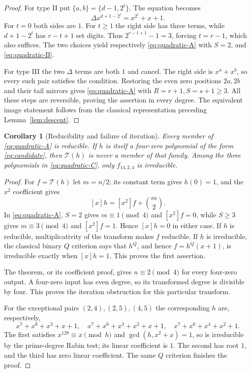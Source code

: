 \documentclass[11pt]{article}
\newtheorem{corollary}[proposition]{Corollary}
\theoremstyle{definition}
\theoremstyle{remark}
\begin{document}
\begin{proof}
For type II put $\{a,b\}=\{d-1,2^t\}$. The equation becomes
\[
 \Delta x^{d+1-2^t}=x^{2^t}+x+1.
\]
For $t=0$ both sides are $1$. For $t\ge1$ the right side has
three terms, while $d+1-2^t$ has $r-t+1$ set digits. Thus
$2^{r-t+1}-1=3$, forcing $t=r-1$, which also suffices.
The two choices yield respectively \eqref{eq:quadratic-A} with
$S=2$, and \eqref{eq:quadratic-B}.

For type III the two $\Delta$ terms are both $1$ and cancel.
The right side is $x^a+x^b$, so every such pair satisfies the
condition. Restoring the even zero positions $2a,2b$ and their
tail mirrors gives \eqref{eq:quadratic-A} with $R=r+1,S=s+1\ge3$.
All these steps are reversible, proving the assertion in every degree.
The equivalent image statement follows from the classical
representation preceding Lemma~\ref{lem:descent}.
\end{proof}

\begin{corollary}[Reducibility and failure of iteration]
\label{cor:quadratic-limits}
Every member of \eqref{eq:quadratic-A} is reducible.
If $h$ is itself a four-zero polynomial of the form
\eqref{eq:candidate}, then $\mathcal T(h)$ is never a member of
that family. Among the three polynomials in
\eqref{eq:quadratic-C}, only $f_{14,2,4}$ is irreducible.
\end{corollary}
\begin{proof}
For $f=\mathcal T(h)$ let $m=n/2$; its constant term gives $h(0)=1$,
and the $x^2$ coefficient gives
\begin{equation}\label{eq:quadratic-trace}
 [x]h=[x^2]f+\binom m2.
\end{equation}
In \eqref{eq:quadratic-A}, $S=2$ gives $m\equiv1\pmod4$ and
$[x^2]f=0$, while $S\ge3$ gives $m\equiv3\pmod4$ and $[x^2]f=1$.
Hence $[x]h=0$ in either case. If $h$ is reducible, multiplicativity
of the transform makes $f$ reducible. If $h$ is irreducible, the
classical binary $Q$ criterion \cite[Theorem 1.1]{Ugo13} says that
$h^Q$, and hence $f=h^Q(x+1)$, is irreducible exactly when $[x]h=1$.
This proves the first assertion.

The theorem, or its coefficient proof, gives $n\equiv2\pmod4$
for every four-zero output. A four-zero input has even degree,
so its transformed degree is divisible by four. This proves the
iteration obstruction for this particular transform.

For the exceptional pairs $(2,4),(2,5),(4,5)$ the corresponding
$h$ are, respectively,
\[
 x^7+x^6+x^3+x+1,\quad
 x^7+x^6+x^3+x^2+x+1,\quad
 x^7+x^6+x^4+x^2+1.
\]
The first satisfies $x^{128}\equiv x\pmod h$ and
$\gcd(h,x^2+x)=1$, so is irreducible by the prime-degree Rabin test;
its linear coefficient is $1$. The second has root $1$,
and the third has zero linear coefficient. The same $Q$ criterion
finishes the proof.
\end{proof}
\end{document}
